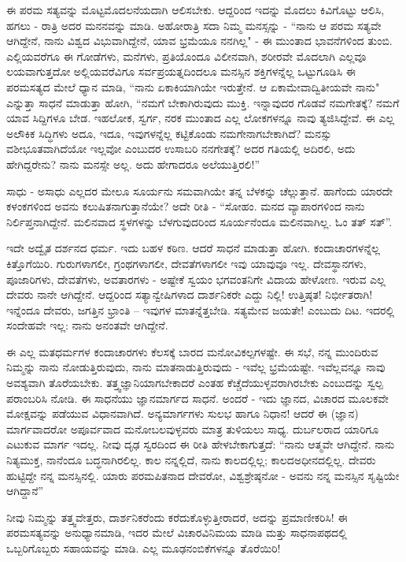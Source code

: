 ಈ ಪರಮ ಸತ್ಯವನ್ನು ಮೊಟ್ಟಮೊದಲನೆಯದಾಗಿ ಆಲಿಸಬೇಕು. ಆದ್ದರಿಂದ ಇದನ್ನು ಮೊದಲು ಕಿವಿಗೊಟ್ಟು ಆಲಿಸಿ, ಹಗಲು - ರಾತ್ರಿ ಅದರ ಮನನವನ್ನು ಮಾಡಿ. ಅಹೋರಾತ್ರಿ ಸದಾ ನಿಮ್ಮ ಮನಸ್ಸನ್ನು - “ನಾನು ಆ ಪರಮ ಸತ್ಯವೇ ಆಗಿದ್ದೇನೆ, ನಾನು ವಿಶ್ವದ ವಿಭುವಾಗಿದ್ದೇನೆ, ಯಾವ ಭ್ರಮೆಯೂ ನನಗಿಲ್ಲ" - ಈ ಮುಂತಾದ ಭಾವನೆಗಳಿಂದ ತುಂಬಿ. ಎಲ್ಲಿಯವರೆಗೂ ಈ ಗೋಡೆಗಳು, ಮನೆಗಳು, ಪ್ರತಿಯೊಂದೂ ವಿಲೀನವಾಗಿ, ಶರೀರವೇ ಮೊದಲಾಗಿ ಎಲ್ಲವೂ ಲಯವಾಗುತ್ತದೋ ಅಲ್ಲಿಯವರೆವಿಗೂ ಸರ್ವಪ್ರಯತ್ನದಿಂದಲೂ ಮನಸ್ಸಿನ ಶಕ್ತಿಗಳನ್ನೆಲ್ಲ ಒಟ್ಟುಗೂಡಿಸಿ ಈ ಪರಮಸತ್ಯದ ಮೇಲೆ ಧ್ಯಾನ ಮಾಡಿ, “ನಾನು ಏಕಾಕಿಯಾಗಿಯೇ ಇರುತ್ತೇನೆ. ಆ ಏಕಾಮೇವಾದ್ವಿತೀಯವೇ ನಾನು" ಎನ್ನುತ್ತಾ ಸಾಧನೆ ಮಾಡುತ್ತಾ ಹೋಗಿ, “ನಮಗೆ ಬೇಕಾಗಿರುವುದು ಮುಕ್ತಿ. ಇನ್ನಾವುದರ ಗೊಡವೆ ನಮಗೇತಕ್ಕೆ? ನಮಗೆ ಯಾವ ಸಿದ್ದಿಗಳೂ ಬೇಡ. ಇಹಲೋಕ, ಸ್ವರ್ಗ, ನರಕ ಮುಂತಾದ ಎಲ್ಲ ಲೋಕಗಳನ್ನೂ ನಾವು ತ್ಯಜಿಸಿದ್ದೇವೆ. ಈ ಎಲ್ಲ ಅಲೌಕಿಕ ಸಿದ್ಧಿಗಳು ಅದೂ, ಇದೂ, ಇವುಗಳನ್ನೆಲ್ಲ ಕಟ್ಟಿಕೊಂಡು ನಮಗೇನಾಗಬೇಕಾಗಿದೆ? ಮನಸ್ಸು ವಶೀಭೂತವಾಗಿದೆಯೋ ಇಲ್ಲವೋ ಎಂಬುದರ ಉಸಾಬರಿ ನನಗೇತಕ್ಕೆ? ಅದರ ಗತಿಯಲ್ಲಿ ಅದಿರಲಿ, ಅದು ಹೇಗಿದ್ದರೇನು? ನಾನು ಮನಸ್ಸೇ ಅಲ್ಲ. ಅದು ಹೇಗಾದರೂ ಅಲೆಯುತ್ತಿರಲಿ!”

ಸಾಧು - ಅಸಾಧು ಎಲ್ಲದರ ಮೇಲೂ ಸೂರ್ಯನು ಸಮವಾಗಿಯೇ ತನ್ನ ಬೆಳಕನ್ನು ಚೆಲ್ಲುತ್ತಾನೆ. ಹಾಗೆಂದು ಯಾರದೇ ಕಳಂಕಗಳಿಂದ ಅವನು ಕಲುಷಿತನಾಗುತ್ತಾನೆಯೇ? ಅದೇ ರೀತಿ - “ಸೋಹಂ. ಮನದ ವ್ಯಾಪಾರಗಳಿಂದ ನಾನು ನಿರ್ಲಿಪ್ತನಾಗಿದ್ದೇನೆ. ಮಲಿನವಾದ ಸ್ಥಳಗಳನ್ನು ಬೆಳಗುವುದರಿಂದ ಸೂರ್ಯನೆಂದೂ ಮಲಿನವಾಗಿಲ್ಲ. ಓಂ ತತ್ ಸತ್”.

ಇದೇ ಅದ್ವೈತ ದರ್ಶನದ ಧರ್ಮ. ಇದು ಬಹಳ ಕಠಿಣ. ಆದರೆ ಸಾಧನೆ ಮಾಡುತ್ತಾ ಹೋಗಿ. ಕಂದಾಚಾರಗಳನ್ನೆಲ್ಲ ಕಿತ್ತೊಗೆಯಿರಿ. ಗುರುಗಳಾಗಲೀ, ಗ್ರಂಥಗಳಾಗಲೀ, ದೇವತೆಗಳಾಗಲೀ ಇವು ಯಾವುವೂ ಇಲ್ಲ. ದೇವಸ್ಥಾನಗಳು, ಪೂಜಾರಿಗಳು, ದೇವತೆಗಳು, ಅವತಾರಗಳು - ಅಷ್ಟೇಕೆ ಸ್ವಯಂ ಭಗವಂತನಿಗೇ ವಿದಾಯ ಹೇಳೋಣ. ಇರುವ ಎಲ್ಲ ದೇವರು ನಾನೇ ಆಗಿದ್ದೇನೆ. ಆದ್ದರಿಂದ ಸತ್ಯಾನ್ವೇಷಿಗಳಾದ ದಾರ್ಶನಿಕರೇ ಎದ್ದು ನಿಲ್ಲಿ! ಉತ್ತಿಷ್ಠತ! ನಿರ್ಭೀತರಾಗಿ! ಇನ್ನೆಂದೂ ದೇವರು, ಜಗತ್ತಿನ ಭ್ರಾಂತಿ – ಇವುಗಳ ಮಾತನ್ನೆತ್ತಬೇಡಿ. ಸತ್ಯಮೇವ ಜಯತೇ! ಎಂಬುದು ದಿಟ. ಇದರಲ್ಲಿ ಸಂದೇಹವೇ ಇಲ್ಲ: ನಾನು ಅನಂತವೇ ಆಗಿದ್ದೇನೆ.

ಈ ಎಲ್ಲ ಮತಧರ್ಮಗಳ ಕಂದಾಚಾರಗಳು ಕೆಲಸಕ್ಕೆ ಬಾರದ ಮನೋವಿಕಲ್ಪಗಳಷ್ಟೇ. ಈ ಸಭೆ, ನನ್ನ ಮುಂದಿರುವ ನಿಮ್ಮನ್ನು ನಾನು ನೋಡುತ್ತಿರುವುದು, ನಾನು ಮಾತನಾಡುತ್ತಿರುವುದು - ಇವೆಲ್ಲ ಭ್ರಮೆಯಷ್ಟೇ. ಇವೆಲ್ಲವನ್ನೂ ನಾವು ಅವಶ್ಯವಾಗಿ ತೊರೆಯಬೇಕು. ತತ್ತ್ವಜ್ಞಾನಿಯಾಗಬೇಕಾದರೆ ಎಂತಹ ಕೆಚ್ಚೆದೆಯುಳ್ಳವರಾಗಿರಬೇಕು ಎಂಬುದನ್ನು ಸ್ವಲ್ಪ ಪರಾಂಬರಿಸಿ ನೋಡಿ. ಈ ಸಾಧನೆಯು ಜ್ಞಾನಮಾರ್ಗದ ಸಾಧನೆ. ಅಂದರೆ - ಇದು ಜ್ಞಾನದ, ವಿಚಾರದ ಮೂಲಕವೇ ಮೋಕ್ಷವನ್ನು ಪಡೆಯುವ ವಿಧಾನವಾಗಿದೆ. ಅನ್ಯಮಾರ್ಗಗಳು ಸುಲಭ ಹಾಗೂ ನಿಧಾನ! ಆದರೆ ಈ (ಜ್ಞಾನ) ಮಾರ್ಗವಾದರೋ ಅಪೂರ್ವವಾದ ಮನೋಬಲವುಳ್ಳವರು ಮಾತ್ರ ತುಳಿಯಲು ಸಾಧ್ಯ. ದುರ್ಬಲರಾದ ಯಾರಿಗೂ ಎಟುಕುವ ಮಾರ್ಗ ಇದಲ್ಲ. ನೀವು ದೃಢ ಸ್ವರದಿಂದ ಈ ರೀತಿ ಹೇಳಬೇಕಾಗುತ್ತದೆ: “ನಾನು ಆತ್ಮವೇ ಆಗಿದ್ದೇನೆ. ನಾನು ನಿತ್ಯಮುಕ್ತ, ನಾನೆಂದೂ ಬದ್ಧನಾಗಿರಲಿಲ್ಲ. ಕಾಲ ನನ್ನಲ್ಲಿದೆ, ನಾನು ಕಾಲದಲ್ಲಿಲ್ಲ; ಕಾಲದ\break ಅಧೀನದಲ್ಲಿಲ್ಲ. ದೇವರು ಹುಟ್ಟಿದ್ದೇ ನನ್ನ ಮನಸ್ಸಿನಲ್ಲಿ. ಯಾರು ಪರಮಪಿತನಾದ ದೇವರೋ, ವಿಶ್ವಶ್ರೇಷ್ಠನೋ - ಅವನು ನನ್ನ ಮನಸ್ಸಿನ ಸೃಷ್ಟಿಯೇ ಆಗಿದ್ದಾನೆ''

ನೀವು ನಿಮ್ಮನ್ನು ತತ್ತ್ವವೇತ್ತರು, ದಾರ್ಶನಿಕರೆಂದು ಕರೆದುಕೊಳ್ಳುತ್ತೀರಾದರೆ, ಅದನ್ನು ಪ್ರಮಾಣೀಕರಿಸಿ! ಈ ಪರಮಸತ್ಯವನ್ನು ಅನುಧ್ಯಾನಮಾಡಿ, ಇದರ ಮೇಲೆ ವಿಚಾರವಿನಿಮಯ ಮಾಡಿ ಮತ್ತು ಸಾಧನಾಪಥದಲ್ಲಿ ಒಬ್ಬರಿಗೊಬ್ಬರು ಸಹಾಯವನ್ನು ಮಾಡಿ. ಎಲ್ಲ ಮೂಢನಂಬಿಕೆಗಳನ್ನೂ ತೊರೆಯಿರಿ!

